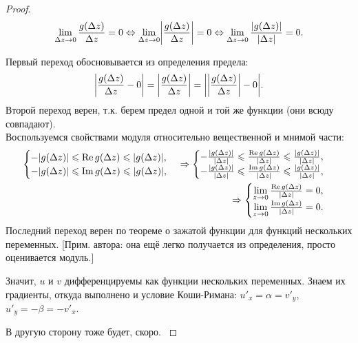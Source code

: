 \begin{proof}
	\begin{align*}
		\ulim{\Delta z \to 0} \frac{g(\Delta z)}{\Delta z} = 0 \Lra \ulim{\Delta z \to 0} \jleft\lvert \frac{g(\Delta z)}{\Delta z} \jright\rvert = 0 \Lra \ulim{\Delta z \to 0} \frac{\lvert g(\Delta z) \rvert}{\lvert \Delta z \rvert} = 0.
	\end{align*}

	Первый переход обосновывается из определения предела: \[
		\jleft\lvert \frac{g(\Delta z)}{\Delta z} - 0 \jright\rvert = \jleft\lvert \frac{g(\Delta z)}{\Delta z} \jright\rvert = \jleft\lvert \jleft\lvert \frac{g(\Delta z)}{\Delta z} \jright\rvert - 0 \jright\rvert.
	\]
	Второй переход верен, т.к. берем предел одной и той же функции (они всюду совпадают). \\
	Воспользуемся свойствами модуля относительно вещественной и мнимой части:
	\begin{align*}
		\begin{cases}
			-\mds{g(\Delta z)} \leq \re g(\Delta z) \leq \mds{g(\Delta z)}, \\
			-\mds{g(\Delta z)} \leq \im g(\Delta z) \leq \mds{g(\Delta z)},
		\end{cases}
		\Rightarrow
		\begin{cases}
			-\frac{\mds{g(\Delta z)}}{\mds{\Delta z}} \leq \frac{\re g(\Delta z)}{\mds{\Delta z}} \leq \frac{\mds{g(\Delta z)}}{\mds{\Delta z}}, \\
			-\frac{\mds{g(\Delta z)}}{\mds{\Delta z}} \leq \frac{\im g(\Delta z)}{\mds{\Delta z}} \leq \frac{\mds{g(\Delta z)}}{\mds{\Delta z}},
		\end{cases} \\
		\Rightarrow
		\begin{cases}
			\ulim{z \to 0} \frac{\re g(\Delta z)}{\mds{\Delta z}} = 0, \\
			\ulim{z \to 0} \frac{\im g(\Delta z)}{\mds{\Delta z}} = 0. \\
		\end{cases}
	\end{align*}
	Последний переход верен по теореме о зажатой функции для функций нескольких переменных. [Прим. автора: она ещё легко получается из определения, просто оценивается модуль.]
	
	Значит, $u$ и $v$ дифференцируемы как функции нескольких переменных. Знаем их градиенты, откуда выполнено и условие Коши-Римана: ${u'}_x = \alpha = {v'}_y$, ${u'}_y = -\beta = -{v'}_x$.
	
	{\color{red} В другую сторону тоже будет, скоро. } %
\end{proof}



